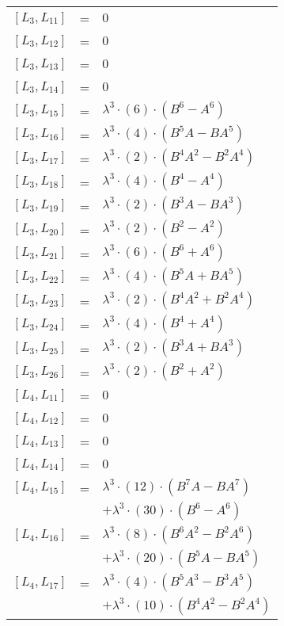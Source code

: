 \documentclass{article}
\begin{document}
\begin{center}
\begin{longtable}{lll}
$[L_{3},L_{11}]$ & = & $ 0 $ \\
$[L_{3},L_{12}]$ & = & $ 0 $ \\
$[L_{3},L_{13}]$ & = & $ 0 $ \\
$[L_{3},L_{14}]$ & = & $ 0 $ \\
$[L_{3},L_{15}]$ & = & ${\lambda}^3{\cdot}(6){\cdot}(B^{6}-A^{6})$ \\
$[L_{3},L_{16}]$ & = & ${\lambda}^3{\cdot}(4){\cdot}(B^{5}A-BA^{5})$ \\
$[L_{3},L_{17}]$ & = & ${\lambda}^3{\cdot}(2){\cdot}(B^{4}A^{2}-B^{2}A^{4})$ \\
$[L_{3},L_{18}]$ & = & ${\lambda}^3{\cdot}(4){\cdot}(B^{4}-A^{4})$ \\
$[L_{3},L_{19}]$ & = & ${\lambda}^3{\cdot}(2){\cdot}(B^{3}A-BA^{3})$ \\
$[L_{3},L_{20}]$ & = & ${\lambda}^3{\cdot}(2){\cdot}(B^{2}-A^{2})$ \\
$[L_{3},L_{21}]$ & = & ${\lambda}^3{\cdot}(6){\cdot}(B^{6}+A^{6})$ \\
$[L_{3},L_{22}]$ & = & ${\lambda}^3{\cdot}(4){\cdot}(B^{5}A+BA^{5})$ \\
$[L_{3},L_{23}]$ & = & ${\lambda}^3{\cdot}(2){\cdot}(B^{4}A^{2}+B^{2}A^{4})$ \\
$[L_{3},L_{24}]$ & = & ${\lambda}^3{\cdot}(4){\cdot}(B^{4}+A^{4})$ \\
$[L_{3},L_{25}]$ & = & ${\lambda}^3{\cdot}(2){\cdot}(B^{3}A+BA^{3})$ \\
$[L_{3},L_{26}]$ & = & ${\lambda}^3{\cdot}(2){\cdot}(B^{2}+A^{2})$ \\
$[L_{4},L_{11}]$ & = & $ 0 $ \\
$[L_{4},L_{12}]$ & = & $ 0 $ \\
$[L_{4},L_{13}]$ & = & $ 0 $ \\
$[L_{4},L_{14}]$ & = & $ 0 $ \\
$[L_{4},L_{15}]$ & = & ${\lambda}^3{\cdot}(12){\cdot}(B^{7}A-BA^{7})$ \\*
 & & $ + {\lambda}^3{\cdot}(30){\cdot}(B^{6}-A^{6})$ \\
$[L_{4},L_{16}]$ & = & ${\lambda}^3{\cdot}(8){\cdot}(B^{6}A^{2}-B^{2}A^{6})$ \\*
 & & $ + {\lambda}^3{\cdot}(20){\cdot}(B^{5}A-BA^{5})$ \\
$[L_{4},L_{17}]$ & = & ${\lambda}^3{\cdot}(4){\cdot}(B^{5}A^{3}-B^{3}A^{5})$ \\*
 & & $ + {\lambda}^3{\cdot}(10){\cdot}(B^{4}A^{2}-B^{2}A^{4})$ \\

\end{longtable}
\end{center}
\end{document}
